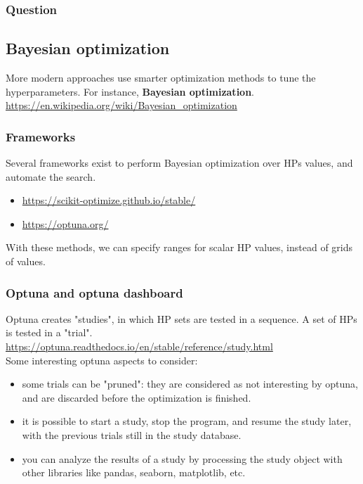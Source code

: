 \documentclass[
10pt, %
a4paper, %
oneside, %
headinclude,footinclude, %
BCOR5mm, %
]{scrartcl}
\begin{document}
\subsubsection{Question}%
\label{ssub:Questino}

{\color{Purple}{Why can we often not run a gradient-based optimization algorithm to look for better HP values ?}}


\subsection{Bayesian optimization}

More modern approaches use smarter optimization methods to tune the hyperparameters. For instance, \textbf{Bayesian optimization}.
\\

\url{https://en.wikipedia.org/wiki/Bayesian_optimization} 
\\

\subsubsection{Frameworks}%
\label{ssub:Frameworks}

Several frameworks exist to perform Bayesian optimization over HPs values, and automate the search.

\begin{itemize}
    \item[skopt] \url{https://scikit-optimize.github.io/stable/} 
    \item[optuna] \url{https://optuna.org/}
\end{itemize}

With these methods, we can specify ranges for scalar HP values, instead of grids of values.
\\

\subsubsection{Optuna and optuna dashboard}%
\label{ssub:Optuna dashboard}

Optuna creates "studies", in which HP sets are tested in a sequence. A set of
HPs is tested in a "trial".
\\

	\url{https://optuna.readthedocs.io/en/stable/reference/study.html} 
    \\

Some interesting optuna aspects to consider:
\begin{itemize}
    \item some trials can be "pruned": they are considered as not interesting by
        optuna, and are discarded before the optimization is finished.
    \item it is possible to start a study, stop the program, and resume the
        study later, with the previous trials still in the study database.
        \item you can analyze the results of a study by processing the study
            object with other libraries like pandas, seaborn, matplotlib,
            etc.
\end{itemize}
\end{document}
